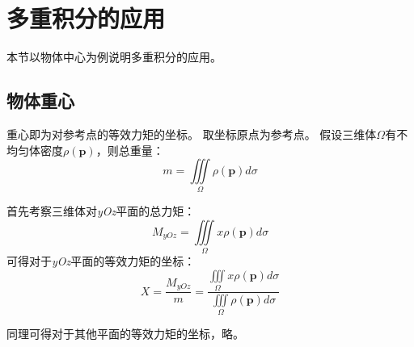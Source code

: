 \section{多重积分的应用}

本节以物体中心为例说明多重积分的应用。

\subsection{物体重心}

重心即为对参考点的等效力矩的坐标。
取坐标原点为参考点。
假设三维体$\varOmega $有不均匀体密度$\rho \left( \boldsymbol{p} \right) $，则总重量：
\[
m=\iiint\limits_{\varOmega}{\rho \left( \boldsymbol{p} \right) d\sigma}
\]

首先考察三维体对{\it yOz}平面的总力矩：
\[
M_{yOz}=\iiint\limits_{\varOmega}{x\rho \left( \boldsymbol{p} \right) d\sigma}
\]
可得对于{\it yOz}平面的等效力矩的坐标：
\[
X=\frac{M_{yOz}}{m}=\frac{\iiint\limits_{\varOmega}{x\rho \left( \boldsymbol{p} \right) d\sigma}}{\iiint\limits_{\varOmega}{\rho \left( \boldsymbol{p} \right) d\sigma}}
\]

同理可得对于其他平面的等效力矩的坐标，略。




